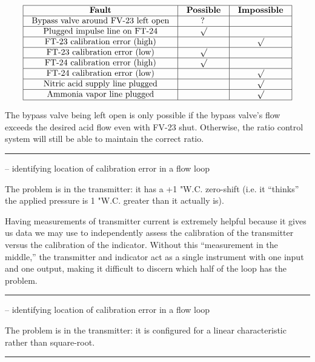 $$\vbox{\offinterlineskip
\halign{\strut
\vrule \quad\hfil # \ \hfil & 
\vrule \quad\hfil # \ \hfil & 
\vrule \quad\hfil # \ \hfil \vrule \cr
\noalign{\hrule}
%
{\bf Fault} & {\bf Possible} & {\bf Impossible} \cr
%
\noalign{\hrule}
%
Bypass valve around FV-23 left open & ? &  \cr
%
\noalign{\hrule}
%
Plugged impulse line on FT-24 & $\surd$ &  \cr
%
\noalign{\hrule}
%
FT-23 calibration error (high) &  & $\surd$ \cr
%
\noalign{\hrule}
%
FT-23 calibration error (low) & $\surd$ &  \cr
%
\noalign{\hrule}
%
FT-24 calibration error (high) & $\surd$ &  \cr
%
\noalign{\hrule}
%
FT-24 calibration error (low) &  & $\surd$ \cr
%
\noalign{\hrule}
%
Nitric acid supply line plugged &  & $\surd$ \cr
%
\noalign{\hrule}
%
Ammonia vapor line plugged &  & $\surd$ \cr
%
\noalign{\hrule}
} %
}$$ %

The bypass valve being left open is only possible if the bypass valve's flow exceeds the desired acid flow even with FV-23 shut.  Otherwise, the ratio control system will still be able to maintain the correct ratio.


\filbreak \vskip 5pt \hrule \vskip 5pt  -- identifying location of calibration error in a flow loop \vskip 10pt

The problem is in the transmitter: it has a +1 "W.C. zero-shift (i.e. it ``thinks'' the applied pressure is 1 "W.C. greater than it actually is).

\vskip 10pt

Having measurements of transmitter current is extremely helpful because it gives us data we may use to independently assess the calibration of the transmitter versus the calibration of the indicator.  Without this ``measurement in the middle,'' the transmitter and indicator act as a single instrument with one input and one output, making it difficult to discern which half of the loop has the problem.

\filbreak \vskip 5pt \hrule \vskip 5pt  -- identifying location of calibration error in a flow loop \vskip 10pt

The problem is in the transmitter: it is configured for a linear characteristic rather than square-root.


\filbreak \vskip 5pt \hrule \vskip 5pt  \vskip 10pt

